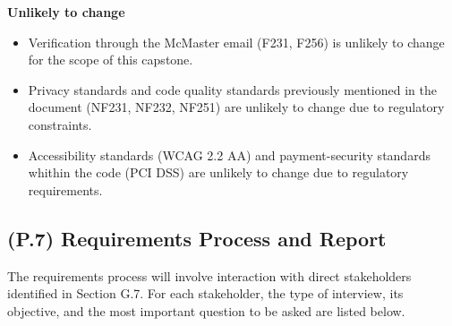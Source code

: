 \documentclass[12pt,letterpaper]{article}
\begin{document}
\textbf{Unlikely to change}
\begin{itemize}
  \item Verification through the McMaster email (F231, F256) is unlikely to change for the scope of this capstone.
  \item Privacy standards and code quality standards previously mentioned in the document (NF231, NF232, NF251) are unlikely to change due to regulatory constraints.
  \item Accessibility standards (WCAG 2.2 AA) and payment-security standards whithin the code (PCI DSS) are unlikely to change due to regulatory requirements.
\end{itemize}


\subsection{(P.7) Requirements Process and Report}
The requirements process will involve interaction with direct stakeholders identified in Section G.7.  
For each stakeholder, the type of interview, its objective, and the most important question to be asked are listed below.
\end{document}
